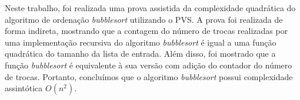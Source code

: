Neste trabalho, foi realizada uma prova assistida da complexidade quadrática do algoritmo de ordenação \textit{bubblesort} utilizando o PVS.
A prova foi realizada de forma indireta, mostrando que a contagem do número de trocas realizadas por uma implementação recursiva do algoritmo \textit{bubblesort} é igual a uma função quadrática do tamanho da lista de entrada.
Além disso, foi mostrado que a função \textit{bubblesort} é equivalente à sua versão com adição do contador do número de trocas. 
Portanto, concluímos que o algoritmo \textit{bubblesort} possui complexidade assintótica $O(n^2)$.
